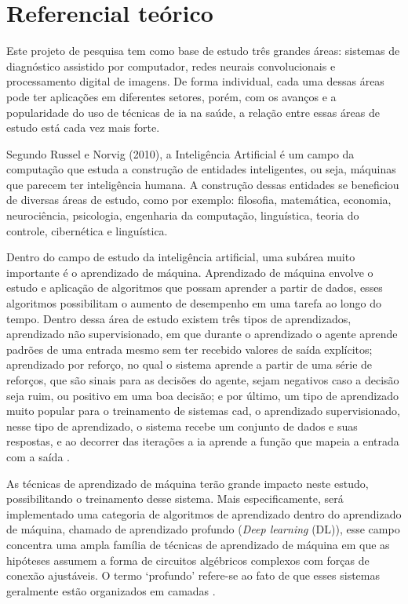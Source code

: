 \section{Referencial teórico}

Este projeto de pesquisa tem como base de estudo três grandes áreas: sistemas de diagnóstico assistido por computador, redes neurais convolucionais e processamento digital de imagens. De forma individual, cada uma dessas áreas pode ter aplicações em diferentes setores, porém, com os avanços e a popularidade do uso de técnicas de \gls{ia} na saúde, a relação entre essas áreas de estudo está cada vez mais forte.


Segundo Russel e Norvig (2010), a Inteligência Artificial  é um campo da computação que estuda a construção de entidades inteligentes, ou seja, máquinas que parecem ter inteligência humana. A construção dessas entidades se beneficiou de diversas áreas de estudo, como por exemplo: filosofia, matemática, economia, neurociência, psicologia, engenharia da computação, linguística, teoria do controle, cibernética e linguística.


Dentro do campo de estudo da inteligência artificial, uma subárea muito importante é o aprendizado de máquina. Aprendizado de máquina envolve o estudo e aplicação de algoritmos que possam aprender a partir de dados, esses algoritmos possibilitam o aumento de desempenho em uma tarefa ao longo do tempo. Dentro dessa área de estudo existem três tipos de aprendizados, aprendizado não supervisionado, em que durante o aprendizado o agente aprende padrões de uma entrada mesmo sem ter recebido valores de saída explícitos; aprendizado por reforço, no qual o sistema aprende a partir de uma série de reforços, que são sinais para as decisões do agente, sejam negativos caso a decisão seja ruim, ou positivo em uma boa decisão; e por último, um tipo de aprendizado muito popular para o treinamento de sistemas \gls{cad}, o aprendizado supervisionado, nesse tipo de aprendizado, o sistema recebe um conjunto de dados e suas respostas, e ao decorrer das iterações a \gls{ia} aprende a função que mapeia a entrada com a saída \cite{haykin2009neural}.

As técnicas de aprendizado de máquina terão grande impacto neste estudo, possibilitando o treinamento desse sistema. Mais especificamente, será implementado uma categoria de algoritmos de aprendizado dentro do aprendizado de máquina, chamado de aprendizado profundo (\textit{Deep learning} (DL)), esse campo concentra uma ampla família de técnicas de aprendizado de máquina em que as hipóteses assumem a forma de circuitos algébricos complexos com forças de conexão ajustáveis. O termo ‘profundo’ refere-se ao fato de que esses sistemas geralmente estão organizados em camadas \cite{10.5555/1671238}.

